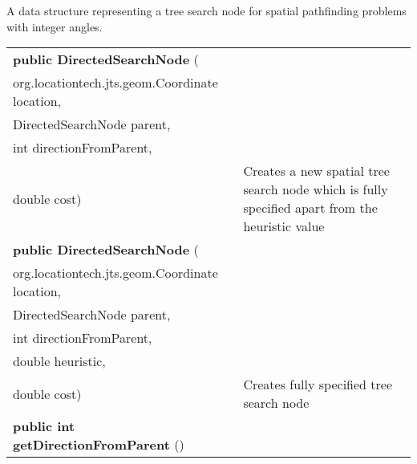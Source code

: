  { A data structure representing a tree search node for \newline%
 spatial pathfinding problems with integer angles.
 
\begin{tabular}{ p{3in}|m{3.4in}}
\textbf{public DirectedSearchNode } (\\ \hspace*{ 5pt} org.locationtech.jts.geom.Coordinate location,\\\hspace*{ 5pt} DirectedSearchNode parent,\\\hspace*{ 5pt} int directionFromParent,\\\hspace*{ 5pt} double cost) & Creates a new spatial tree search node which is fully specified apart from\newline%
 the heuristic value\\ \hline 
\textbf{public DirectedSearchNode } (\\ \hspace*{ 5pt} org.locationtech.jts.geom.Coordinate location,\\\hspace*{ 5pt} DirectedSearchNode parent,\\\hspace*{ 5pt} int directionFromParent,\\\hspace*{ 5pt} double heuristic,\\\hspace*{ 5pt} double cost) & Creates fully specified tree search node\\ \hline 
\textbf{public int getDirectionFromParent} () & \\ \hline 
\end{tabular}
}
